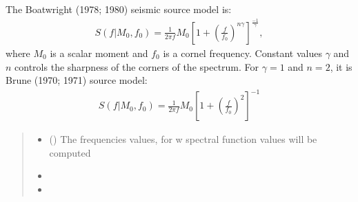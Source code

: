 \documentclass[letterpaper,10pt,english]{sphinxmanual}
\begin{document}
\begin{fulllineitems}
\label{\detokenize{api_support:amw.mw.source_models.BoatwrightSourceModel}}
\pysigstartsignatures
{}
\pysigstopsignatures
\sphinxAtStartPar
The Boatwright (1978; 1980) seismic source model is:
\begin{equation*}
\begin{split}S\left(f|M_0,f_0\right)=
{\frac{1}{2\pi f}M_0\left[{1+\left(\frac{f}{f_0}\right)}^{n\gamma}\right]}^\frac{-1}{\gamma},\end{split}
\end{equation*}
\sphinxAtStartPar
where \(M_0\) is a scalar moment and \(f_0\) is a cornel frequency. Constant values \(\gamma\)
and \(n\) controls the sharpness of the corners of the spectrum. For \(\gamma = 1\) and \(n = 2\),
it is Brune (1970; 1971) source model:
\begin{equation*}
\begin{split}S\left(f|M_0,f_0\right)={\frac{1}{2\pi f}M_0\left[{1+\left(\frac{f}{f_0}\right)}^2\right]}^{-1}\end{split}
\end{equation*}\begin{quote}\begin{description}
\begin{itemize}
\item {} 
\sphinxAtStartPar
{} () \textendash{} The frequencies values, for w spectral function values will be computed

\item {} 
\sphinxAtStartPar
{}

\item {} 
\sphinxAtStartPar
{}

\end{itemize}

\end{description}\end{quote}


\end{fulllineitems}
\end{document}
